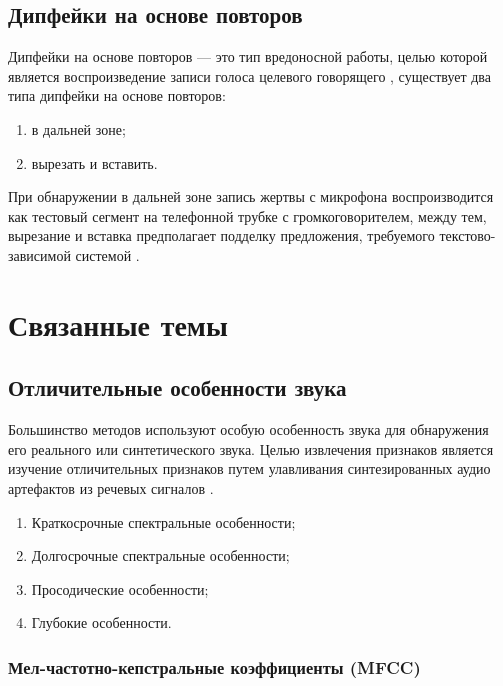 \subsection{Дипфейки на основе повторов}

Дипфейки на основе повторов — это тип вредоносной работы, целью которой является воспроизведение записи голоса целевого говорящего \cite{replay-based-deepfake}, существует два типа дипфейки на основе повторов:

\begin{enumerate}
    \item в дальней зоне;
    \item вырезать и вставить.
\end{enumerate}

При обнаружении в дальней зоне запись жертвы с микрофона воспроизводится как тестовый сегмент на телефонной трубке с громкоговорителем, между тем, вырезание и вставка предполагает подделку предложения, требуемого текстово-зависимой системой \cite{detection-replay-based}.


\section{Связанные темы}

\subsection{Отличительные особенности звука}

Большинство методов используют особую особенность звука для обнаружения его реального или синтетического звука. Целью извлечения признаков является изучение отличительных признаков путем улавливания синтезированных аудио артефактов из речевых сигналов \cite{discrim-features}.
 
\begin{enumerate}
    \item Краткосрочные спектральные особенности;
    \item Долгосрочные спектральные особенности;
    \item Просодические особенности;
    \item Глубокие особенности.
\end{enumerate}



\subsubsection{Мел-частотно-кепстральные коэффициенты (MFCC)}

